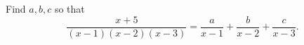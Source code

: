 Find $a, b, c$ so that
\[ \frac{x + 5}{(x - 1)(x - 2)(x - 3)} = \frac{a}{x - 1} + \frac{b}{x - 2} + \frac{c}{x - 3}. \]
